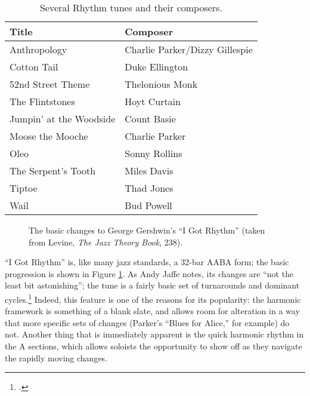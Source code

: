 \begin{table}[tbp]
  \setlength{\tabcolsep}{12pt}
  \centering
  \begin{tabular}{ll}
    Title  & Composer \\
    \hline
    \rule[1em]{0ex}{1ex}%
    Anthropology        & Charlie Parker/Dizzy Gillespie \\
    Cotton Tail         & Duke Ellington \\
    52nd Street Theme   & Thelonious Monk \\
    The Flintstones     & Hoyt Curtain \\
    Jumpin' at the Woodside & Count Basie \\
    Moose the Mooche    & Charlie Parker \\
    Oleo                & Sonny Rollins \\
    The Serpent's Tooth & Miles Davis \\
    Tiptoe              & Thad Jones \\
    Wail                & Bud Powell
  \end{tabular}
  \caption{Several Rhythm tunes and their composers.}
  \label{rcg:rhythm-tunes}
\end{table}

\begin{figure}[tbp]
  \caption[The basic changes to George Gershwin's ``I Got Rhythm.'']{%
    The basic changes to George Gershwin's ``I Got Rhythm'' (taken from
    Levine, \emph{The Jazz Theory Book}, 238).}\nocite{levine:1995}
  \label{rcg:rhythm-basic}
\end{figure}

``I Got Rhythm'' is, like many jazz standards, a 32-bar AABA form; the basic
progression is shown in Figure \ref{rcg:rhythm-basic}. As Andy Jaffe
notes, its changes are ``not the least bit astonishing''; the tune is a fairly
basic set of turnarounds and dominant cycles.\footcite[149]{jaffe:1996}
Indeed, this feature is one of the reasons for its popularity: the harmonic
framework is something of a blank slate, and allows room for alteration in a
way that more specific sets of changes (Parker's ``Blues for Alice,'' for
example) do not. Another thing that is immediately apparent is the quick
harmonic rhythm in the A sections, which allows soloists the opportunity to
show off as they navigate the rapidly moving changes.

